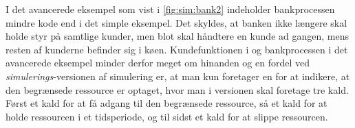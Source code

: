I det avancerede eksempel som vist i  \cref{fig:sim:bank2} indeholder bankprocessen mindre kode end i det simple eksempel. Det skyldes, at banken ikke længere skal holde styr på samtlige kunder, men blot skal håndtere en kunde ad gangen, mens resten af kunderne befinder sig i køen. Kundefunktionen i \simpy og bankprocessen i det avancerede eksempel minder derfor meget om hinanden og en fordel ved \emph{simulerings}-versionen af simulering er, at man kun foretager en  for at indikere, at den begrænsede ressource er optaget, hvor man i \simpy versionen skal foretage tre kald. Først et kald for at få adgang til den begrænsede ressource, så et kald for at holde ressourcen i et tidsperiode, og til sidst et kald for at slippe ressourcen.
